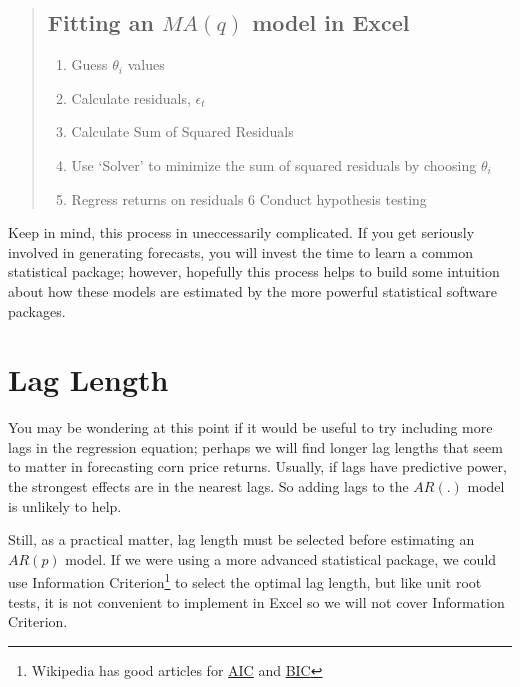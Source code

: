 \documentclass[
]{book}
\providecommand{\tightlist}{%
  \setlength{\itemsep}{0pt}\setlength{\parskip}{0pt}}
\begin{document}
\begin{quote}
\hypertarget{fitting-an-maq-model-in-excel}{%
\subsection{\texorpdfstring{Fitting an \(MA(q)\) model in Excel}{Fitting an MA(q) model in Excel}}\label{fitting-an-maq-model-in-excel}}

\begin{enumerate}
\def\labelenumi{\arabic{enumi}.}
\tightlist
\item
  Guess \(\theta_i\) values
\item
  Calculate residuals, \(\epsilon_t\)
\item
  Calculate Sum of Squared Residuals
\item
  Use `Solver' to minimize the sum of squared residuals by choosing \(\theta_i\)
\item
  Regress returns on residuals
  6 Conduct hypothesis testing
\end{enumerate}
\end{quote}

Keep in mind, this process in uneccessarily complicated. If you get seriously involved in generating forecasts, you will invest the time to learn a common statistical package; however, hopefully this process helps to build some intuition about how these models are estimated by the more powerful statistical software packages.

\hypertarget{lag-length}{%
\section{Lag Length}\label{lag-length}}

You may be wondering at this point if it would be useful to try including more lags in the regression equation; perhaps we will find longer lag lengths that seem to matter in forecasting corn price returns. Usually, if lags have predictive power, the strongest effects are in the nearest lags. So adding lags to the \(AR(.)\) model is unlikely to help.

Still, as a practical matter, lag length must be selected before estimating an \(AR(p)\) model. If we were using a more advanced statistical package, we could use Information Criterion\footnote{Wikipedia has good articles for \href{https://en.wikipedia.org/wiki/Akaike_information_criterion}{AIC} and \href{https://en.wikipedia.org/wiki/Bayesian_information_criterion}{BIC}} to select the optimal lag length, but like unit root tests, it is not convenient to implement in Excel so we will not cover Information Criterion.
\end{document}

